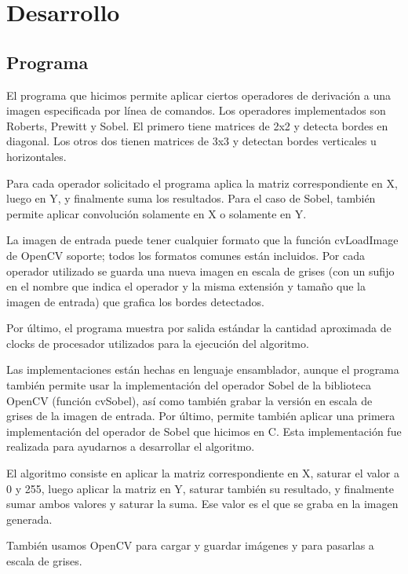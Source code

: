 \section{Desarrollo}

\subsection{Programa}

El programa que hicimos permite aplicar ciertos operadores de derivación a una imagen especificada por línea de comandos. Los operadores implementados son Roberts, Prewitt y Sobel. El primero tiene matrices de 2x2 y detecta bordes en diagonal. Los otros dos tienen matrices de 3x3 y detectan bordes verticales u horizontales.

%
%

Para cada operador solicitado el programa aplica la matriz correspondiente en X, luego en Y, y finalmente suma los resultados. Para el caso de Sobel, también permite aplicar convolución solamente en X o solamente en Y.

La imagen de entrada puede tener cualquier formato que la función cvLoadImage de OpenCV soporte; todos los formatos comunes están incluidos. Por cada operador utilizado se guarda una nueva imagen en escala de grises (con un sufijo en el nombre que indica el operador y la misma extensión y tamaño que la imagen de entrada) que grafica los bordes detectados.

Por último, el programa muestra por salida estándar la cantidad aproximada de clocks de procesador utilizados para la ejecución del algoritmo.

Las implementaciones están hechas en lenguaje ensamblador, aunque el programa también permite usar la implementación del operador Sobel de la biblioteca OpenCV (función cvSobel), así como también grabar la versión en escala de grises de la imagen de entrada. Por último, permite también aplicar una primera implementación del operador de Sobel que hicimos en C. Esta implementación fue realizada para ayudarnos a desarrollar el algoritmo.

El algoritmo consiste en aplicar la matriz correspondiente en X, saturar el valor a 0 y 255, luego aplicar la matriz en Y, saturar también su resultado, y finalmente sumar ambos valores y saturar la suma. Ese valor es el que se graba en la imagen generada.

También usamos OpenCV para cargar y guardar imágenes y para pasarlas a escala de grises.

